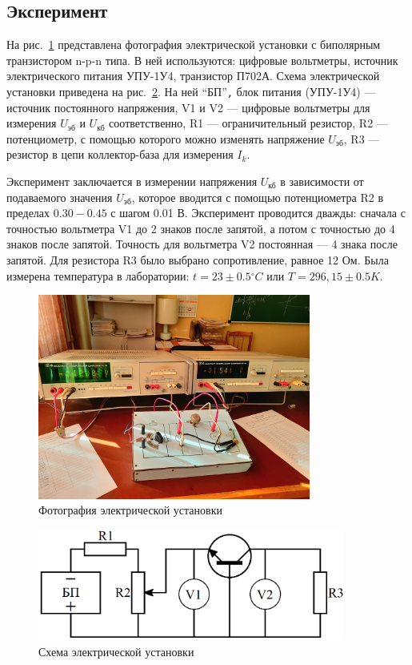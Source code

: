 \subsection{Эксперимент}
На рис.~\ref{fig:photo} представлена фотография электрической установки с биполярным транзистором n-p-n типа. В ней используются: цифровые вольтметры, источник электрического питания УПУ-1У4, транзистор П702А. Схема электрической установки приведена на рис.~\ref{fig:scheme}. На ней ``БП''\verb|,| блок питания (УПУ-1У4) — источник постоянного напряжения, V1 и V2 — цифровые вольтметры для измерения $U_{\text{эб}}$ и $U_{\text{кб}}$ соответственно, R1 — ограничительный резистор, R2 — потенциометр, с помощью которого можно изменять напряжение $U_{\text{эб}}$, R3 — резистор в цепи коллектор-база для измерения $I_k$.

Эксперимент заключается в измерении напряжения $U_{\text{кб}}$ в зависимости от подаваемого значения $U_{\text{эб}}$, которое вводится с помощью потенциометра R2 в пределах $0.30{-}0.45$ с шагом 0.01 В. Эксперимент проводится дважды: сначала с точностью вольтметра V1 до 2 знаков после запятой, а потом с точностью до 4 знаков после запятой. Точность для вольтметра V2 постоянная — 4 знака после запятой. Для резистора R3 было выбрано сопротивление, равное 12 Ом. Была измерена температура  в лаборатории: $t = {23 \pm 0.5}{^\circ}C$ или $T = {296,15 \pm 0.5}K$.

\begin{figure}[H]
\centering
\includegraphics[width=0.8\textwidth]{photo.jpg}
\caption{Фотография электрической установки}
\label{fig:photo}
\end{figure}

\begin{figure}[H]
\centering
\includegraphics[width=0.9\textwidth]{scheme.png}
\caption{Схема электрической установки}
\label{fig:scheme}
\end{figure}

